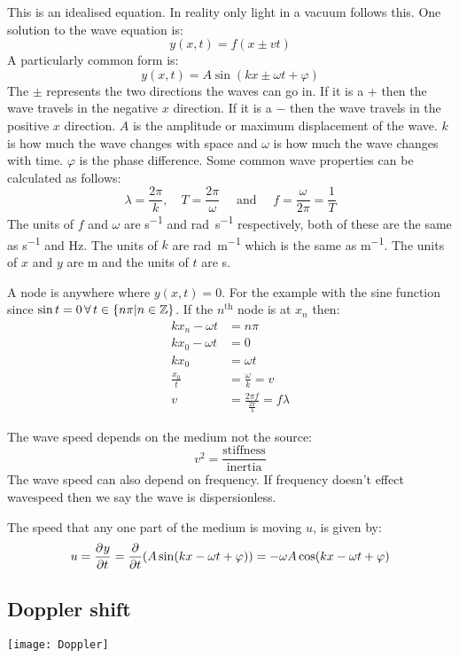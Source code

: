 This is an idealised equation. In reality only light in a vacuum follows this. One solution to the wave equation is:
\[y(x,t)=f(x\pm vt)\]
A particularly common form is:
\[y(x,t)=A\sin(kx\pm\omega t+\varphi)\]
The \(\pm\) represents the two directions the waves can go in. If it is a \(+\) then the wave travels in the negative \(x\) direction. If it is a \(-\) then the wave travels in the positive \(x\) direction. \(A\) is the amplitude or maximum displacement of the wave. \(k\) is how much the wave changes with space and \(\omega\) is how much the wave changes with time. \(\varphi\) is the phase difference. Some common wave properties can be calculated as follows:
\[\lambda=\frac{2\pi}{k},\quad T=\frac{2\pi}{\omega}\quad\text{ and }\quad f=\frac{\omega}{2\pi}=\frac 1T\]
The units of \(f\) and \(\omega\) are \si{s^{-1}} and \si{rad.s^{-1}} respectively, both of these are the same as \si{s^{-1}} and \si{Hz}. The units of \(k\) are \si{rad.m^{-1}} which is the same as \si{m^{-1}}. The units of \(x\) and \(y\) are \si{m} and the units of \(t\) are \si{s}.

A node is anywhere where \(y(x,t)=0\). For the example with the sine function since \(\sin t=0\,\forall\, t\in\{n\pi|n\in\mathbb{Z}\}\). If the \(n^{\text{th}}\) node is at \(x_n\) then:
\begin{align*}
kx_n-\omega t&=n\pi\\
kx_0-\omega t&=0\\
kx_0&=\omega t\\
\frac{x_0}{t}&=\frac{\omega}{k}=v\\
v&=\frac{2\pi f}{\frac{2\pi}{\lambda}}=f\lambda
\end{align*}

The wave speed depends on the medium not the source:
\[v^2=\frac{\text{stiffness}}{\text{inertia}}\]
The wave speed can also depend on frequency. If frequency doesn't effect wavespeed then we say the wave is dispersionless. 

The speed that any one part of the medium is moving \(u\), is given by:
\[u=\frac{\partial^{}{y}}{\partial{t}^{}}=\frac{\partial}{\partial t}(A\sin(kx-\omega t+\varphi))=-\omega A\cos(kx-\omega t+\varphi)\]

\subsection*{Doppler shift}

\begin{center}
\texttt{[image: Doppler]}
\end{center}

